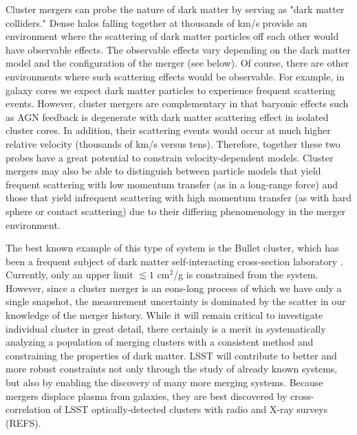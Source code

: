 \vspace{1em} 
\label{sec:merging_clusters}

Cluster mergers can probe the nature of dark matter by serving as "dark matter colliders." Dense halos falling together at thousands of km/s provide an environment where the scattering of dark matter particles off each other would have observable effects.  The observable effects vary depending on the dark matter model and the configuration of the merger (see below).  Of course, there are other environments where such scattering effects would be observable. For example, in galaxy cores we expect dark matter particles to experience frequent scattering events. However, cluster mergers are complementary in that baryonic effects such as AGN feedback is degenerate with dark matter scattering effect in isolated cluster cores. In addition, their scattering events would occur at much higher relative velocity (thousands of km/s versus tens). Therefore, together these two probes have a great potential to constrain velocity-dependent models.  Cluster mergers may also be able to distinguish between particle models that yield frequent scattering with low momentum transfer (as in a long-range force) and those that yield infrequent scattering with high momentum transfer (as with hard sphere or contact scattering) due to their differing phenomenology in the merger environment.

The best known example of this type of system is the Bullet cluster, which has been a frequent subject of dark matter self-interacting cross-section laboratory \citep{2008ApJ...679.1173R,2017MNRAS.465..569R}. Currently, only an upper limit  $\lesssim 1$ cm$^2$/g is constrained from the system.
However, since a cluster merger is an eons-long process of which we have only a single snapshot, the measurement uncertainty is dominated by the scatter in our knowledge of the merger history. While it will remain critical to investigate individual cluster in great detail, there certainly is a merit in systematically analyzing a population of merging clusters with a consistent method and constraining the properties of dark matter.
LSST will contribute to better and more robust constraints not only through the study of already known systems, but also by enabling the discovery of many more merging systems. Because mergers displace plasma from galaxies, they are best discovered by cross-correlation of  LSST optically-detected clusters with radio and X-ray surveys (REFS).

